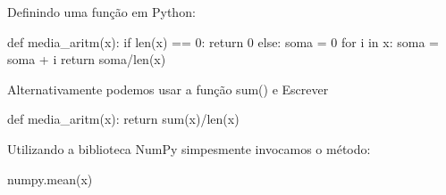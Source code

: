 Definindo uma função em Python:
\begin{python}
    def media_aritm(x):
    if len(x) == 0:
        return 0
    else:
        soma = 0
        for i in x:
            soma = soma + i
        return soma/len(x)
\end{python}

Alternativamente podemos usar a função sum() e Escrever
\begin{python}
    def media_aritm(x):
         return sum(x)/len(x)
\end{python}

Utilizando a biblioteca NumPy simpesmente invocamos o método:
\begin{python}
    numpy.mean(x)
\end{python}



